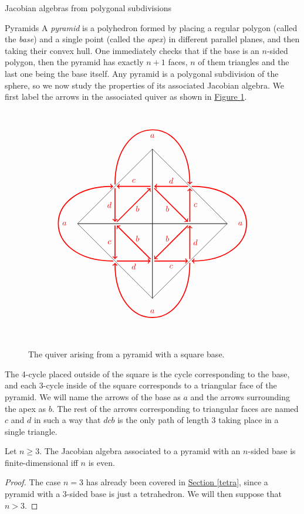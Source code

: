 \begin{chapter}{Jacobian algebras from polygonal subdivisions}
\begin{section}{Pyramids}
\label{pyramids}
A \emph{pyramid} is a polyhedron formed by placing a regular polygon (called the \emph{base}) and a single point (called the \emph{apex}) in different parallel planes, and then taking their convex hull. One immediately checks that if the base is an $n$-sided polygon, then the pyramid has exactly $n+1$ faces, $n$ of them triangles and the last one being the base itself.
Any pyramid is a polygonal subdivision of the sphere, so we now study the properties of its associated Jacobian algebra. We first label the arrows in the associated quiver as shown in 
\hyperref[pyramid-quiver]{Figure \ref*{pyramid-quiver}}.

\begin{figure}[h]
\[
\begin{tikzpicture}[scale=0.8]
\foreach \x in {0,90,...,270}
{
\begin{scope}[rotate=\x]
\draw (0,0) -- (4,0);
\draw (0,0) -- (0,-4);
\draw (4,0) -- (0,-4);
\node at (0.8,-0.8) {\textcolor{red}{$b$}};
\node at (1,-2.3) {\textcolor{red}{$c$}};
\node at (2.3,-1) {\textcolor{red}{$d$}};
\node at (0,-4.7) {\textcolor{red}{$a$}};
\draw [<-, red, very thick] (0.1, -1.9) to (1.9, -0.1);
\draw [<-, red, very thick] (2, -0.1) to  (2, -1.9);
\draw [<-, red, very thick] (1.9, -2) to  (0.1, -2);
\draw [<-, red, very thick] (-2, -2.1) to [bend right=90, looseness=2.5] (2, -2.1);
\end{scope}
}
\end{tikzpicture}
\]
\caption{The quiver arising from a pyramid with a square base.}
\label{pyramid}
\label{pyramid-quiver}
\end{figure}

The 4-cycle placed outside of the square is the cycle corresponding to the base, and each 3-cycle inside of the square corresponds to a triangular face of the pyramid. We will name the arrows of the base as $a$ and the arrows surrounding the apex as $b$. The rest of the arrows corresponding to triangular faces are named $c$ and $d$ in such a way that $dcb$ is the only path of length 3 taking place in a single triangle.

\begin{thm} Let $n\geq 3$. The Jacobian algebra associated to a pyramid with an $n$-sided base is finite-dimensional iff $n$ is even.
\end{thm}
\begin{proof} The case $n=3$ has already been covered in \hyperref[tetra]{Section \ref*{tetra}}, since a pyramid with a 3-sided base is just a tetrahedron. We will then suppose that $n> 3$.


\end{proof}
\end{section}
\end{chapter}
